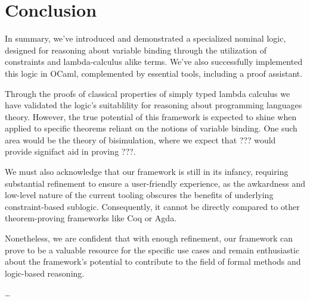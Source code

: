 \documentclass[english, mgr]{iithesis}
\begin{document}
\chapter{Conclusion}

In summary, we've introduced and demonstrated a specialized nominal logic,
designed for reasoning about variable binding
through the utilization of constraints and lambda-calculus alike terms.
We've also successfully implemented this logic in OCaml,
complemented by essential tools, including a proof assistant.

Through the proofs of classical properties of simply typed lambda calculus
we have validated the logic's suitablility for reasoning about
programming languages theory.
However, the true potential of this framework is expected to shine when applied to
specific theorems reliant on the notions of variable binding.
One such area would be the theory of bisimulation, where we expect that ???
would provide signifact aid in proving ???.

We must also acknowledge that our framework is still in its infancy,
requiring substantial refinement to ensure a user-friendly experience, as the
awkardness and low-level nature of the current tooling obscures the benefits
of underlying constraint-based sublogic.
Consequently, it cannot be directly compared to other theorem-proving frameworks like Coq or Agda.

Nonetheless, we are confident that with enough refinement,
our framework can prove to be a valuable resource for the specific use cases and
remain enthusiastic about the framework's potential to
contribute to the field of formal methods and logic-based reasoning.


\begin{thebibliography}{1}
 \ldots
\end{thebibliography}
\end{document}
